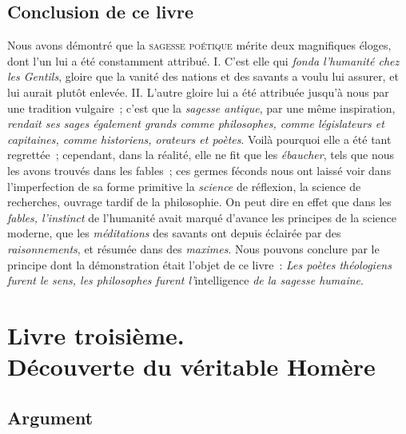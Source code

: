 \documentclass[french,twoside]{book} %
\newcommand\chapteropen{} %
\newcommand\chaptercont{} %
\newcommand\chapterclose{} %
\begin{document}
\chapteropen
\chapter[{Conclusion de ce livre}]{Conclusion de ce livre}

\chaptercont
\noindent  Nous avons démontré que la {\scshape sagesse poétique} mérite deux magnifiques éloges, dont l’un lui a été constamment attribué. I. C’est elle qui {\itshape fonda l’humanité chez les Gentils}, gloire que la vanité des nations et des savants a voulu lui assurer, et lui aurait plutôt enlevée. II. L’autre gloire lui a été attribuée jusqu’à nous par une tradition vulgaire ; c’est que la {\itshape sagesse antique}, par une même inspiration, {\itshape rendait ses sages également grands comme philosophes, comme législateurs et capitaines, comme historiens, orateurs et poètes}. Voilà pourquoi elle a été tant regrettée ; cependant, dans la réalité, elle ne fit que les {\itshape ébaucher}, tels que nous les avons trouvés dans les fables ; ces germes féconds nous ont laissé voir dans l’imperfection de sa forme primitive la {\itshape science} de réflexion, la science de recherches, ouvrage tardif de la philosophie. On peut dire en effet que dans les {\itshape fables, l’instinct} de l’humanité avait marqué d’avance les principes de la science moderne, que les {\itshape méditations} des savants ont depuis éclairée par des {\itshape raisonnements}, et résumée dans des {\itshape maximes}. Nous pouvons conclure par le principe dont la démonstration était l’objet de ce livre : {\itshape Les poètes théologiens furent le sens, les philosophes furent l’}intelligence {\itshape de la sagesse humaine}.
\chapterclose

\chapterclose


\chapteropen
\part[{Livre troisième. Découverte du véritable Homère}]{Livre troisième. \\
Découverte du véritable Homère}

\chaptercont

\chapteropen
\chapter[{Argument}]{Argument}
\end{document}
